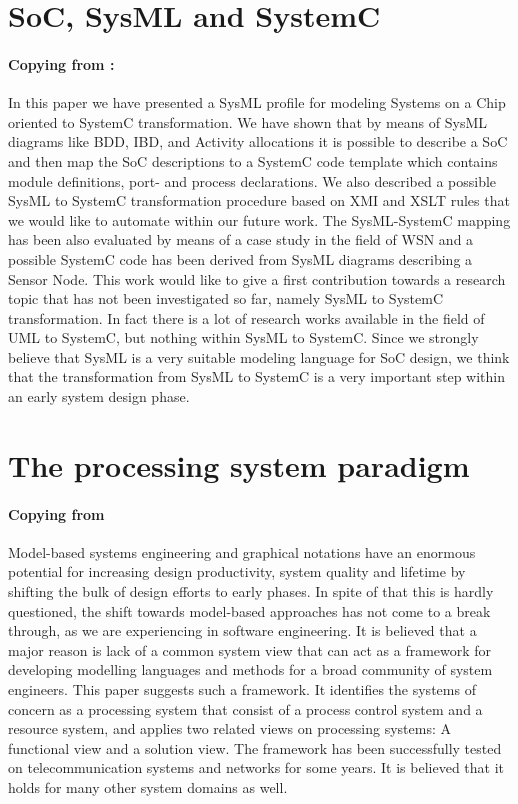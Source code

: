 \documentclass[a4paper,12pt,twoside]{report}
\begin{document}
		\section{SoC, SysML and SystemC}
			\paragraph{Copying from \cite{SoCSysMLSystemC} : } {In this paper we have presented a SysML profile for modeling Systems on a Chip oriented to SystemC transformation. We have shown that by means of SysML diagrams like BDD, IBD, and Activity allocations it is possible to describe a SoC and then map the SoC descriptions to a SystemC code template which contains module definitions, port- and process declarations. We also described a possible SysML to SystemC transformation procedure based on XMI and XSLT rules that we would like to automate within our future work. The SysML-SystemC mapping has been also evaluated by means of a case study in the field of WSN and a possible SystemC code has been derived from SysML diagrams describing a Sensor Node. This work would like to give a first contribution towards a research topic that has not been investigated so far, namely SysML to SystemC transformation. In fact there is a lot of research works available in the field of UML to SystemC, but nothing within SysML to SystemC. Since we strongly believe that SysML is a very suitable modeling language for SoC design, we think that the transformation from SysML to SystemC is a very important step within an early system design phase.
			}

		\section{The processing system paradigm}
			\paragraph{Copying from \cite{ProcessingSysPar}} {Model-based systems engineering and graphical notations have an enormous potential for increasing design productivity, system quality and lifetime by shifting the bulk of design efforts to early phases. In spite of that this is hardly questioned, the shift towards model-based approaches has not come to a break through, as we are experiencing in software engineering. It is believed that a major reason is lack of a common system view that can act as a framework for developing modelling languages and methods for a broad community of system engineers. This paper suggests such a framework. It identifies the systems of concern as a processing system that consist of a process control system and a resource system, and applies two related views on processing systems: A functional view and a solution view. The framework has been successfully tested on telecommunication systems and networks for some years. It is believed that it holds for many other system domains as well.
			}
			
\end{document}

